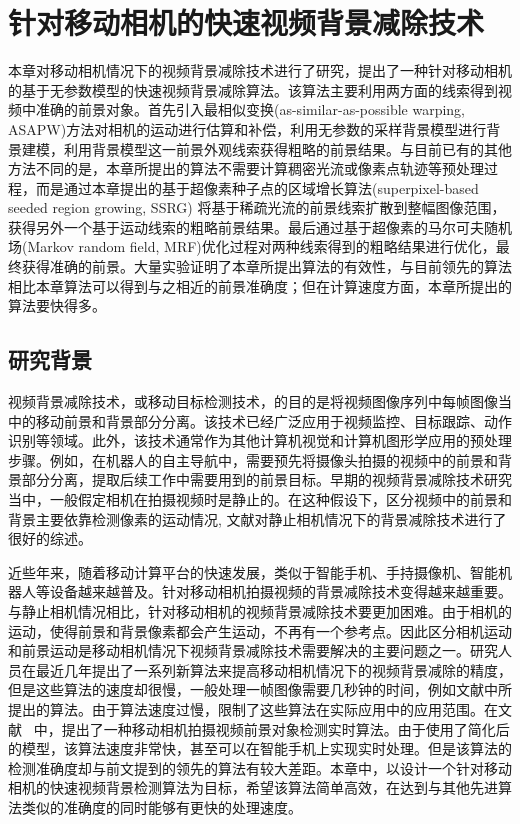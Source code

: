 \chapter{针对移动相机的快速视频背景减除技术}
 \label{ch4:FMCBS}
 本章对移动相机情况下的视频背景减除技术进行了研究，提出了一种针对移动相机的基于无参数模型的快速视频背景减除算法。该算法主要利用两方面的线索得到视频中准确的前景对象。首先引入最相似变换(as-similar-as-possible warping, ASAPW)方法对相机的运动进行估算和补偿，利用无参数的采样背景模型进行背景建模，利用背景模型这一前景外观线索获得粗略的前景结果。与目前已有的其他方法不同的是，本章所提出的算法不需要计算稠密光流或像素点轨迹等预处理过程，而是通过本章提出的基于超像素种子点的区域增长算法(superpixel-based seeded region growing, SSRG) 将基于稀疏光流的前景线索扩散到整幅图像范围，获得另外一个基于运动线索的粗略前景结果。最后通过基于超像素的马尔可夫随机场(Markov random field, MRF)优化过程对两种线索得到的粗略结果进行优化，最终获得准确的前景。大量实验证明了本章所提出算法的有效性，与目前领先的算法相比本章算法可以得到与之相近的前景准确度；但在计算速度方面，本章所提出的算法要快得多。

 \section{研究背景}
 \label{ch4:sec:background}
视频背景减除技术，或移动目标检测技术，的目的是将视频图像序列中每帧图像当中的移动前景和背景部分分离。该技术已经广泛应用于视频监控、目标跟踪、动作识别等领域。此外，该技术通常作为其他计算机视觉和计算机图形学应用的预处理步骤。例如，在机器人的自主导航中，需要预先将摄像头拍摄的视频中的前景和背景部分分离，提取后续工作中需要用到的前景目标。早期的视频背景减除技术研究当中，一般假定相机在拍摄视频时是静止的。在这种假设下，区分视频中的前景和背景主要依靠检测像素的运动情况\cite{GMMPAMI,Barnich2011ViBe,pbas,vibe,subsenseTIP}, 文献对静止相机情况下的背景减除技术进行了很好的综述。\par

近些年来，随着移动计算平台的快速发展，类似于智能手机、手持摄像机、智能机器人等设备越来越普及。针对移动相机拍摄视频的背景减除技术变得越来越重要。与静止相机情况相比，针对移动相机的视频背景减除技术要更加困难。由于相机的运动，使得前景和背景像素都会产生运动，不再有一个参考点。因此区分相机运动和前景运动是移动相机情况下视频背景减除技术需要解决的主要问题之一。研究人员在最近几年提出了一系列新算法来提高移动相机情况下的视频背景减除的精度\cite{iccv2009,kwak2011Generalized,Cui2012,Multitransform,gbsuperpixel,SubspaceTracking}，但是这些算法的速度却很慢，一般处理一帧图像需要几秒钟的时间，例如文献中所提出的算法。由于算法速度过慢，限制了这些算法在实际应用中的应用范围。在文献 ~中，提出了一种移动相机拍摄视频前景对象检测实时算法。由于使用了简化后的模型，该算法速度非常快，甚至可以在智能手机上实现实时处理。但是该算法的检测准确度却与前文提到的领先的算法有较大差距。本章中，以设计一个针对移动相机的快速视频背景检测算法为目标，希望该算法简单高效，在达到与其他先进算法类似的准确度的同时能够有更快的处理速度。\par


